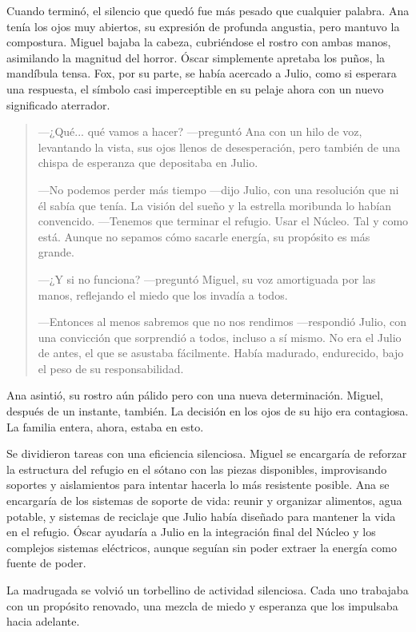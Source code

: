 \documentclass[a4paper,12pt]{book}
\begin{document}
Cuando terminó, el silencio que quedó fue más pesado que cualquier palabra. Ana tenía los ojos muy abiertos, su expresión de profunda angustia, pero mantuvo la compostura. Miguel bajaba la cabeza, cubriéndose el rostro con ambas manos, asimilando la magnitud del horror. Óscar simplemente apretaba los puños, la mandíbula tensa. Fox, por su parte, se había acercado a Julio, como si esperara una respuesta, el símbolo casi imperceptible en su pelaje ahora con un nuevo significado aterrador.

\begin{quote}
    —¿Qué... qué vamos a hacer? —preguntó Ana con un hilo de voz, levantando la vista, sus ojos llenos de desesperación, pero también de una chispa de esperanza que depositaba en Julio.

    —No podemos perder más tiempo —dijo Julio, con una resolución que ni él sabía que tenía. La visión del sueño y la estrella moribunda lo habían convencido. —Tenemos que terminar el refugio. Usar el Núcleo. Tal y como está. Aunque no sepamos cómo sacarle energía, su propósito es más grande.

    —¿Y si no funciona? —preguntó Miguel, su voz amortiguada por las manos, reflejando el miedo que los invadía a todos.

    —Entonces al menos sabremos que no nos rendimos —respondió Julio, con una convicción que sorprendió a todos, incluso a sí mismo. No era el Julio de antes, el que se asustaba fácilmente. Había madurado, endurecido, bajo el peso de su responsabilidad.
\end{quote}

Ana asintió, su rostro aún pálido pero con una nueva determinación. Miguel, después de un instante, también. La decisión en los ojos de su hijo era contagiosa. La familia entera, ahora, estaba en esto.

Se dividieron tareas con una eficiencia silenciosa. Miguel se encargaría de reforzar la estructura del refugio en el sótano con las piezas disponibles, improvisando soportes y aislamientos para intentar hacerla lo más resistente posible. Ana se encargaría de los sistemas de soporte de vida: reunir y organizar alimentos, agua potable, y sistemas de reciclaje que Julio había diseñado para mantener la vida en el refugio. Óscar ayudaría a Julio en la integración final del Núcleo y los complejos sistemas eléctricos, aunque seguían sin poder extraer la energía como fuente de poder.

La madrugada se volvió un torbellino de actividad silenciosa. Cada uno trabajaba con un propósito renovado, una mezcla de miedo y esperanza que los impulsaba hacia adelante.
\end{document}
